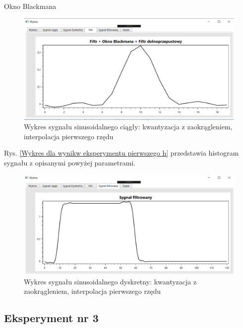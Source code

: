 \documentclass[12pt]{article}
\begin{document}
\newpage
Okno Blackmana
\begin{figure}[h!]
 \centering
 \includegraphics[width=12.3cm]{prostFDOB.PNG}
 \vspace{-0.3cm}
 \caption{Wykres sygnału sinusoidalnego ciągły: kwantyzacja z zaokrągleniem, interpolacja pierwszego rzędu}
 \label{Wykres dla wyników eksperymentu drugiego}
\end{figure}
\newpage
Rys. \ref{Wykres dla wynikw eksperymentu pierwszego h} przedstawia histogram sygnału z opisanymi powyżej parametrami. 
\begin{figure}[h!]
 \centering
 \includegraphics[width=12.3cm]{prostSFDB.PNG}
 \vspace{-0.3cm}
 \caption{Wykres sygnału sinusoidalnego dyskretny: kwantyzacja z zaokrągleniem, interpolacja pierwszego rzędu}
 \label{Histogram dla wyników eksperymentu drugiego}
\end{figure}


\subsection{Eksperyment nr 3}
\end{document}
